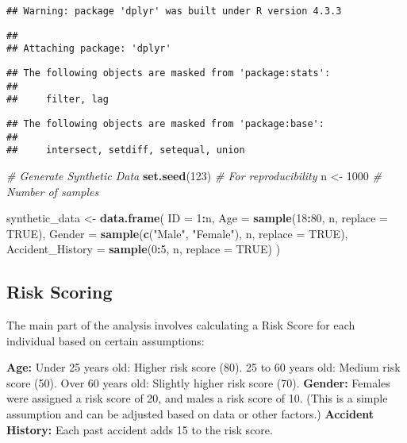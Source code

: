 \documentclass[
]{article}
\newenvironment{Shaded}{\begin{snugshade}}{\end{snugshade}}
\newcommand{\AttributeTok}[1]{\textcolor[rgb]{0.13,0.29,0.53}{#1}}
\newcommand{\CommentTok}[1]{\textcolor[rgb]{0.56,0.35,0.01}{\textit{#1}}}
\newcommand{\ConstantTok}[1]{\textcolor[rgb]{0.56,0.35,0.01}{#1}}
\newcommand{\DecValTok}[1]{\textcolor[rgb]{0.00,0.00,0.81}{#1}}
\newcommand{\FunctionTok}[1]{\textcolor[rgb]{0.13,0.29,0.53}{\textbf{#1}}}
\newcommand{\NormalTok}[1]{#1}
\newcommand{\OtherTok}[1]{\textcolor[rgb]{0.56,0.35,0.01}{#1}}
\newcommand{\SpecialCharTok}[1]{\textcolor[rgb]{0.81,0.36,0.00}{\textbf{#1}}}
\newcommand{\StringTok}[1]{\textcolor[rgb]{0.31,0.60,0.02}{#1}}
\begin{document}
\begin{verbatim}
## Warning: package 'dplyr' was built under R version 4.3.3
\end{verbatim}

\begin{verbatim}
## 
## Attaching package: 'dplyr'
\end{verbatim}

\begin{verbatim}
## The following objects are masked from 'package:stats':
## 
##     filter, lag
\end{verbatim}

\begin{verbatim}
## The following objects are masked from 'package:base':
## 
##     intersect, setdiff, setequal, union
\end{verbatim}

\begin{Shaded}
\begin{Highlighting}[]
\CommentTok{\# Generate Synthetic Data}
\FunctionTok{set.seed}\NormalTok{(}\DecValTok{123}\NormalTok{) }\CommentTok{\# For reproducibility}
\NormalTok{n }\OtherTok{\textless{}{-}} \DecValTok{1000} \CommentTok{\# Number of samples}

\NormalTok{synthetic\_data }\OtherTok{\textless{}{-}} \FunctionTok{data.frame}\NormalTok{(}
  \AttributeTok{ID =} \DecValTok{1}\SpecialCharTok{:}\NormalTok{n,}
  \AttributeTok{Age =} \FunctionTok{sample}\NormalTok{(}\DecValTok{18}\SpecialCharTok{:}\DecValTok{80}\NormalTok{, n, }\AttributeTok{replace =} \ConstantTok{TRUE}\NormalTok{),}
  \AttributeTok{Gender =} \FunctionTok{sample}\NormalTok{(}\FunctionTok{c}\NormalTok{(}\StringTok{"Male"}\NormalTok{, }\StringTok{"Female"}\NormalTok{), n, }\AttributeTok{replace =} \ConstantTok{TRUE}\NormalTok{),}
  \AttributeTok{Accident\_History =} \FunctionTok{sample}\NormalTok{(}\DecValTok{0}\SpecialCharTok{:}\DecValTok{5}\NormalTok{, n, }\AttributeTok{replace =} \ConstantTok{TRUE}\NormalTok{)}
\NormalTok{)}
\end{Highlighting}
\end{Shaded}

\subsection{Risk Scoring}\label{risk-scoring}

The main part of the analysis involves calculating a Risk Score for each
individual based on certain assumptions:

\textbf{Age:} Under 25 years old: Higher risk score (80). 25 to 60 years
old: Medium risk score (50). Over 60 years old: Slightly higher risk
score (70). \textbf{Gender:} Females were assigned a risk score of 20,
and males a risk score of 10. (This is a simple assumption and can be
adjusted based on data or other factors.) \textbf{Accident History:}
Each past accident adds 15 to the risk score.
\end{document}
